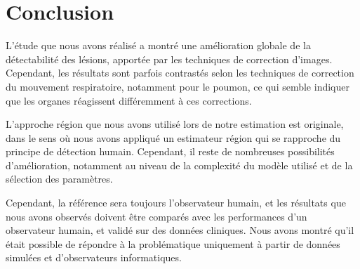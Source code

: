 



\section{Conclusion}

L'étude que nous avons réalisé a montré une amélioration globale de la détectabilité des lésions, apportée par les techniques de correction d'images. Cependant, les résultats sont parfois contrastés selon les techniques de correction du mouvement respiratoire, notamment pour le poumon, ce qui semble indiquer que les organes réagissent différemment à ces corrections.

L'approche région que nous avons utilisé lors de notre estimation est originale, dans le sens où nous avons appliqué un estimateur région qui se rapproche du principe de détection humain. Cependant, il reste de nombreuses possibilités d'amélioration, notamment au niveau de la complexité du modèle utilisé et de la sélection des paramètres. 

Cependant, la référence sera toujours l'observateur humain, et les résultats que nous avons observés doivent être comparés avec les performances d'un observateur humain, et validé sur des données cliniques. Nous avons montré qu'il était possible de répondre à la problématique uniquement à partir de données simulées et d'observateurs informatiques.
